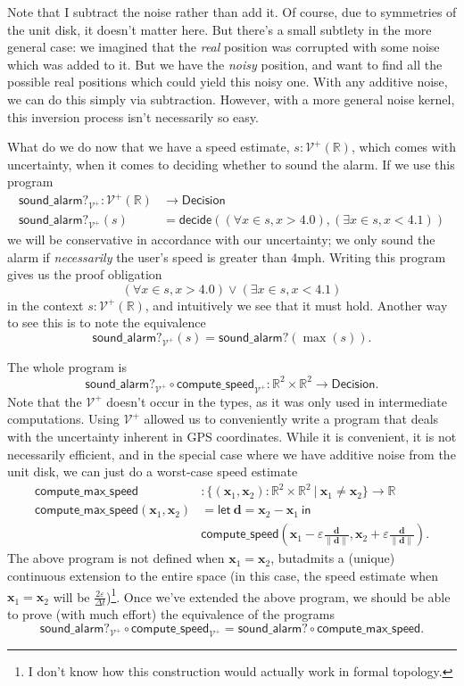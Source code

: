 \documentclass{article}           %
\newcommand{\R}{\mathbb{R}}
\newcommand{\suchthat}{\ |\ }
\newcommand{\Viet}{{\mathcal{V}^+}}
\newcommand{\ve}[1]{\mathbf{#1}}
\begin{document}
Note that I subtract the noise rather than add it. Of course, due to symmetries of the unit disk, it doesn't matter here. But there's a small subtlety in the more general case: we imagined that the \emph{real} position was corrupted with some noise which was added to it. But we have the \emph{noisy} position, and want to find all the possible real positions which could yield this noisy one. With any additive noise, we can do this simply via subtraction. However, with a more general noise kernel, this inversion process isn't necessarily so easy.

What do we do now that we have a speed estimate, $s : \Viet(\R)$, which comes with uncertainty, when it comes to deciding whether to sound the alarm. If we use this program
\begin{align*}
\mathsf{sound\_alarm?}_\Viet : \Viet(\R) &\to \mathsf{Decision}
\\ \mathsf{sound\_alarm?}_\Viet(s) &= \mathsf{decide}((\forall x \in s, x > 4.0) , (\exists x \in s, x < 4.1))
\end{align*}
we will be conservative in accordance with our uncertainty; we only sound the alarm if \emph{necessarily} the user's speed is greater than 4mph. Writing this program gives us the proof obligation
\[
\left( \forall x \in s, x > 4.0 \right) \vee \left( \exists x \in s, x < 4.1 \right)
\]
in the context $s : \Viet(\R)$, and intuitively we see that it must hold. Another way to see this is to note the equivalence 
\[
\mathsf{sound\_alarm?}_\Viet(s) = \mathsf{sound\_alarm?}(\max(s)).
\]

The whole program is 
\[
\mathsf{sound\_alarm?}_\Viet \circ \mathsf{compute\_speed}_\Viet : \R^2 \times \R^2 \to \mathsf{Decision}.
\]
Note that the $\Viet$ doesn't occur in the types, as it was only used in intermediate computations. Using $\Viet$ allowed us to conveniently write a program that deals with the uncertainty inherent in GPS coordinates. While it is convenient, it is not necessarily efficient, and in the special case where we have additive noise from the unit disk, we can just do a worst-case speed estimate
\begin{align*}
\mathsf{compute\_max\_speed} &: \{ (\ve{x}_1, \ve{x}_2) : \R^2 \times \R^2 \suchthat \ve{x}_1 \ne \ve{x}_2 \} \to \R
\\ \mathsf{compute\_max\_speed} (\ve{x}_1, \ve{x}_2) &= 
\mathsf{let}\ \ve{d} = \ve{x}_2 - \ve{x}_1\ \mathsf{in}\ 
\\
&\mathsf{compute\_speed}\left( 
\ve{x}_1 - \varepsilon \frac{\ve{d}}{\| \ve{d} \|}, \ve{x}_2 + \varepsilon \frac{\ve{d}}{\| \ve{d} \|}
\right).
\end{align*}
The above program is not defined when $\ve{x}_1 = \ve{x}_2$, butadmits a (unique) continuous extension to the entire space (in this case, the speed estimate when $\ve{x}_1 = \ve{x}_2$ will be $\frac{2\varepsilon}{\Delta t}$)\footnote{I don't know how this construction would actually work in formal topology.}.
Once we've extended the above program, we should be able to prove (with much effort) the equivalence of the programs
\[
\mathsf{sound\_alarm?}_\Viet \circ \mathsf{compute\_speed}_\Viet
=
\mathsf{sound\_alarm?} \circ \mathsf{compute\_max\_speed}.
\]
\end{document}

